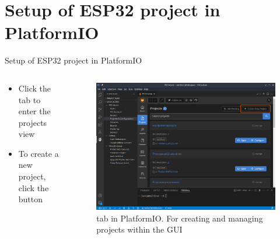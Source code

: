 \documentclass[aspectratio=169]{beamer}
\begin{document}
\section{Setup of ESP32 project in PlatformIO}
\begin{frame}
\end{frame}

\begin{frame}{Setup of ESP32 project in PlatformIO}
\begin{columns}
	\begin{column}{0.5\textwidth}
		\begin{textBox}
			\begin{itemize}
				\item Click the tab  to enter the projects view
				\item To create a new project, click the button 
			\end{itemize}
		\end{textBox}
	\end{column}
	\begin{column}{0.5\textwidth}
		\begin{figure}
  			\includegraphics[width=\textwidth,keepaspectratio=true]{assets/pictures/pio-project.png}
  			\caption{ tab in PlatformIO. For creating and managing projects within the GUI}
  			\label{fig:pio-project}
		\end{figure}
	\end{column}
\end{columns}
\end{frame}
\end{document}

